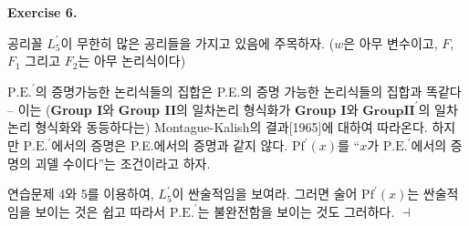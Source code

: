 \documentclass[12pt]{paper}
\newenvironment{context}[1][]
{ \noindent \textbf{{#1}.}
}
{ \hfill $ \dashv $ }
\begin{document}
\begin{context}[Exercise 6]
공리꼴 $L_5^{\prime}$이 무한히 많은 공리들을 가지고 있음에 주목하자.
($w$은 아무 변수이고, $F$, $F_1$ 그리고 $F_2$는 아무 논리식이다)

$\mathrm{P.E.}^{\prime}$의 증명가능한 논리식들의 집합은 P.E.의 증명 가능한 논리식들의 집합과 똑같다 --
이는 (\textbf{Group I}와 \textbf{Group II}의 일차논리 형식화가 \textbf{Group I}와 $\mathbf{Group II}^{\prime}$의 일차논리 형식화와 동등하다는) Montague-Kalish의 결과[1965]에 대하여 따라온다.
하지만 $\mathrm{P.E.}^{\prime}$에서의 증명은 P.E.에서의 증명과 같지 않다.
$\mathrm{Pf}^{\prime} \left( x \right)$를 ``$x$가 $\mathrm{P.E.}^{\prime}$에서의 증명의 괴델 수이다''는 조건이라고 하자.

연습문제 4와 5를 이용하여, $L_5^{\prime}$이 싼술적임을 보여라.
그러면 술어 $\mathrm{Pf}^{\prime} \left( x \right)$는 싼술적임을 보이는 것은 쉽고
따라서 $\mathrm{P.E.}^{\prime}$는 불완전함을 보이는 것도 그러하다.
\end{context}
\end{document}
